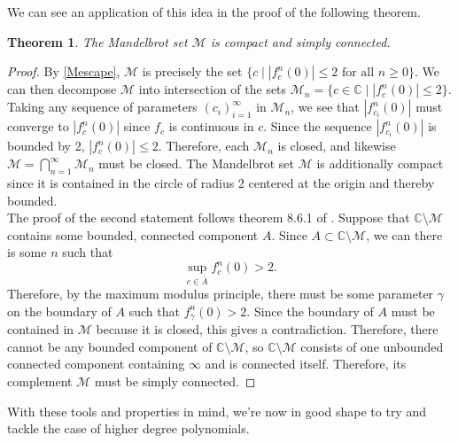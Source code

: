 \documentclass{amsart}
\newcommand{\bbC}{\mathbb{C}}
\newcommand{\cal}[1]{ \mathcal{#1}}
\newcommand{\Mand}{\cal{M}}
\newcommand{\abs}[1]{ \left| #1 \right| }
\newtheorem{thm}{Theorem}[section]
\theoremstyle{definition}
\theoremstyle{remark}
\numberwithin{equation}{section}
\begin{document}
We can see an application of this idea in the proof of the following theorem.
\begin{thm}
  The Mandelbrot set $\Mand$ is compact and simply connected.
\end{thm}
\begin{proof}
By \cref{Mescape}, $\Mand$ is precisely the set $\{c\mid \abs{f_c^n(0)}\leq 2\text{ for all } n\geq 0 \}$. We can then decompose $\Mand$ into intersection of the sets $\Mand_n=\{c\in\bbC \mid \abs{f^n_c(0)}\leq 2\}$. Taking any sequence of parameters $(c_i)_{i=1}^\infty$ in $\Mand_n$, we see that  $\abs{f^n_{c_i}(0)}$ must converge to $\abs{f^n_c(0)}$ since $f_c$ is continuous in $c$. Since the sequence $\abs{f^n_{c_i}(0)}$ is bounded by 2, $\abs{f^n_c(0)}\leq 2$. Therefore, each $\Mand_n$ is closed, and likewise $\Mand=\bigcap_{n=1}^\infty \Mand_n$ must be closed. The Mandelbrot set $\Mand$ is additionally compact since it is contained in the circle of radius 2 centered at the origin and thereby bounded. \\

The proof of the second statement follows theorem 8.6.1 of \cite{brin_stuck_2002}. Suppose that $\bbC\setminus\Mand$ contains some bounded, connected component $A$. Since $A\subset\bbC\setminus\Mand$, we can there is some $n$ such that \[
\sup_{c\in\overline{A}}f^n_c(0)>2.
\]
Therefore, by the maximum modulus principle, there must be some parameter $\gamma$ on the boundary of $A$ such that $f^n_\gamma(0)>2$. Since the boundary of $A$ must be contained in  $\Mand$ because it is closed, this gives a contradiction. Therefore, there cannot be any bounded component of $\bbC\setminus \Mand$, so $\bbC\setminus \Mand$ consists of one unbounded connected component containing $\infty$ and is connected itself. Therefore, its complement $\Mand$ must be simply connected.
\end{proof}

With these tools and properties in mind, we're now in good shape to try and tackle the case of higher degree polynomials.



\end{document}
